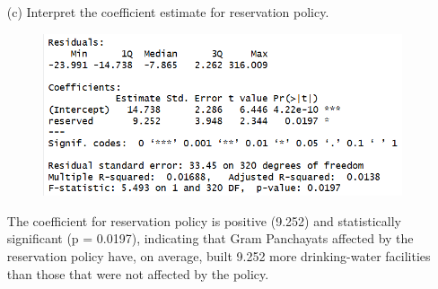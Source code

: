 \documentclass[12pt,letterpaper]{article}
\begin{document}
\begin{enumerate}
	
	
	\vspace{1cm}
	\item [(c)] Interpret the coefficient estimate for reservation policy. 
	
		 
	
	\begin{figure}[h]
		\centering
		\includegraphics[width=0.75\linewidth]{regression_output2.png}
	\end{figure}
	
		The coefficient for reservation policy is positive (9.252) and statistically significant (p = 0.0197), indicating that Gram Panchayats affected by the reservation policy have, on average, built 9.252 more drinking-water facilities than those that were not affected by the policy.
	
\end{enumerate}


\end{document}
